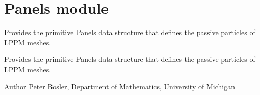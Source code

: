 \hypertarget{group__Panels}{\section{Panels module}
\label{group__Panels}
}


Provides the primitive Panels data structure that defines the passive particles of L\+P\+P\+M meshes.  


Provides the primitive Panels data structure that defines the passive particles of L\+P\+P\+M meshes. 

\begin{DoxyAuthor}{Author}
Peter Bosler, Department of Mathematics, University of Michigan 
\end{DoxyAuthor}
